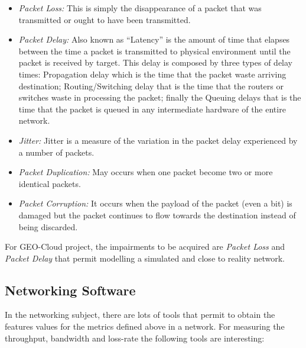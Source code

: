 \begin{itemize}
\item \emph{Packet Loss:} This is simply the disappearance of a packet that was
  transmitted or ought to have been transmitted.
\item \emph{Packet Delay:} Also known as ``Latency'' is the amount of time that elapses between the time a
  packet is transmitted to physical environment until the packet is received by
  target. This delay is composed by three types of delay times: Propagation
  delay which is the time that the packet waste arriving destination;
  Routing/Switching delay that is the time that the routers or
  switches waste in processing the packet; finally the Queuing delays that is
  the time that the packet is queued in any intermediate hardware of the entire network.
\item \emph{Jitter:} Jitter is a measure of the variation in the packet delay
  experienced by a number of packets. 
\item \emph{Packet Duplication:} May occurs when one packet become two or more
  identical packets.
\item \emph{Packet Corruption:} It occurs when the payload of the packet (even a bit)
  is damaged but the packet continues to flow towards the destination instead of
  being discarded.
\end{itemize}

For GEO-Cloud project, the impairments to be acquired are \emph{Packet Loss} and
\emph{Packet Delay} that permit modelling a simulated and close to reality network.


\subsection{Networking Software}

In the networking subject, there are lots of tools that permit to obtain the
features values for the metrics defined above in a network. 
For measuring the throughput, bandwidth and loss-rate the following tools are interesting:

